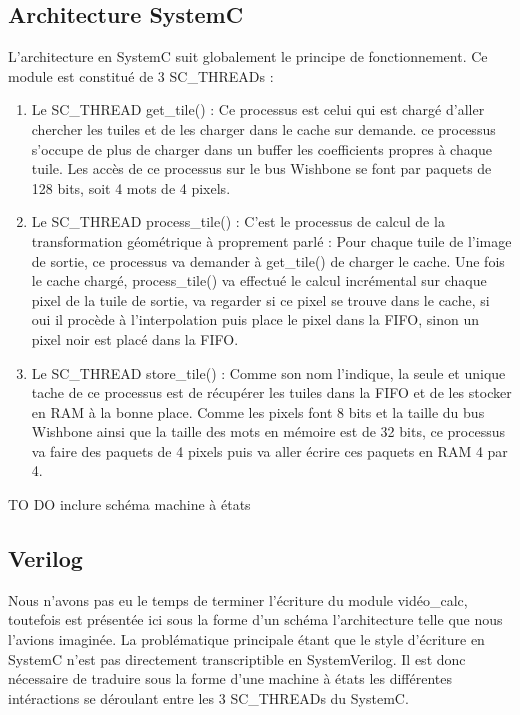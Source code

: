 \documentclass[a4paper,12pt]{report}
\begin{document}
{{	\subsection{Architecture SystemC}
L'architecture en SystemC suit globalement le principe de fonctionnement. Ce module est constitué de 3 SC\_THREADs :

\begin{enumerate}

\item Le SC\_THREAD get\_tile() : Ce processus est celui qui est chargé d'aller chercher les tuiles et de les charger dans le cache sur demande. ce processus s'occupe de plus de charger dans un buffer les coefficients propres à chaque tuile. Les accès de ce processus sur le bus Wishbone se font par paquets de 128 bits, soit 4 mots de 4 pixels.


\item Le SC\_THREAD process\_tile() : C'est le processus de calcul de la transformation géométrique à proprement parlé : Pour chaque tuile de l'image de sortie, ce processus va demander à get\_tile() de charger le cache. Une fois le cache chargé, process\_tile() va effectué le calcul incrémental sur chaque pixel de la tuile de sortie, va regarder si ce pixel se trouve dans le cache, si oui il procède à l'interpolation puis place le pixel dans la FIFO, sinon un pixel noir est placé dans la FIFO.


\item Le SC\_THREAD store\_tile() : Comme son nom l'indique, la seule et unique tache de ce processus est de récupérer les tuiles dans la FIFO et de les stocker en RAM à la bonne place. Comme les  pixels font 8 bits et la taille du bus Wishbone ainsi que la taille des mots en mémoire  est de 32 bits, ce processus va faire des paquets de 4 pixels puis va aller écrire ces paquets en RAM 4 par 4.
\end{enumerate}

TO DO inclure schéma machine à états

	\subsection{Verilog}
Nous n'avons pas eu le temps de terminer l'écriture du module vidéo\_calc, toutefois est présentée ici sous la forme d'un schéma l'architecture telle que nous l'avions imaginée. La problématique principale étant que le style d'écriture en SystemC n'est pas directement transcriptible en SystemVerilog. Il est donc nécessaire de traduire sous la forme d'une machine à états les différentes intéractions se déroulant entre les 3 SC\_THREADs du SystemC.

}}
\end{document}
